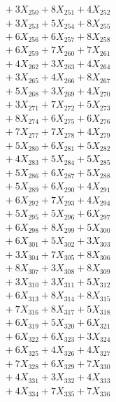 \documentclass[a4paper,10pt]{article}
\begin{document}
{\begin{align}
&\;  + 3 X_{250} + 8 X_{251} + 4 X_{252} \\[0.3ex]
&\;  + 3 X_{253} + 5 X_{254} + 8 X_{255} \\[0.3ex]
&\;  + 6 X_{256} + 6 X_{257} + 8 X_{258} \\[0.3ex]
&\;  + 6 X_{259} + 7 X_{260} + 7 X_{261} \\[0.3ex]
&\;  + 4 X_{262} + 3 X_{263} + 4 X_{264} \\[0.3ex]
&\;  + 3 X_{265} + 4 X_{266} + 8 X_{267} \\[0.3ex]
&\;  + 5 X_{268} + 3 X_{269} + 4 X_{270} \\[0.3ex]
&\;  + 3 X_{271} + 7 X_{272} + 5 X_{273} \\[0.3ex]
&\;  + 8 X_{274} + 6 X_{275} + 6 X_{276} \\[0.3ex]
&\;  + 7 X_{277} + 7 X_{278} + 4 X_{279} \\[0.5ex]\allowbreak
&\;  + 5 X_{280} + 6 X_{281} + 5 X_{282} \\[0.3ex]
&\;  + 4 X_{283} + 5 X_{284} + 5 X_{285} \\[0.3ex]
&\;  + 5 X_{286} + 6 X_{287} + 5 X_{288} \\[0.3ex]
&\;  + 5 X_{289} + 6 X_{290} + 4 X_{291} \\[0.3ex]
&\;  + 6 X_{292} + 7 X_{293} + 4 X_{294} \\[0.3ex]
&\;  + 5 X_{295} + 5 X_{296} + 6 X_{297} \\[0.3ex]
&\;  + 6 X_{298} + 8 X_{299} + 5 X_{300} \\[0.3ex]
&\;  + 6 X_{301} + 5 X_{302} + 3 X_{303} \\[0.3ex]
&\;  + 3 X_{304} + 7 X_{305} + 8 X_{306} \\[0.3ex]
&\;  + 8 X_{307} + 3 X_{308} + 8 X_{309} \\[0.5ex]\allowbreak
&\;  + 3 X_{310} + 3 X_{311} + 5 X_{312} \\[0.3ex]
&\;  + 6 X_{313} + 8 X_{314} + 8 X_{315} \\[0.3ex]
&\;  + 7 X_{316} + 8 X_{317} + 5 X_{318} \\[0.3ex]
&\;  + 6 X_{319} + 5 X_{320} + 6 X_{321} \\[0.3ex]
&\;  + 6 X_{322} + 6 X_{323} + 3 X_{324} \\[0.3ex]
&\;  + 6 X_{325} + 4 X_{326} + 4 X_{327} \\[0.3ex]
&\;  + 7 X_{328} + 6 X_{329} + 7 X_{330} \\[0.3ex]
&\;  + 4 X_{331} + 3 X_{332} + 4 X_{333} \\[0.3ex]
&\;  + 4 X_{334} + 7 X_{335} + 7 X_{336} \\[0.3ex]

\end{align}}
\end{document}
